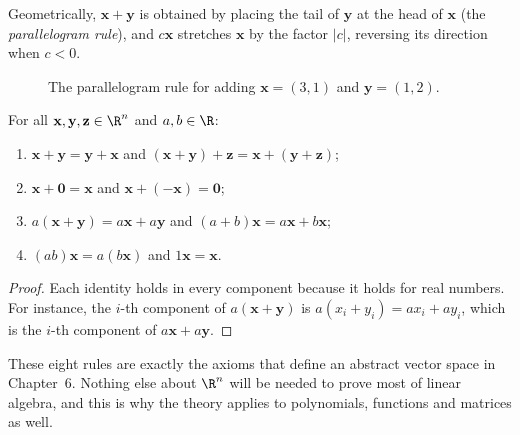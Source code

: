 Geometrically, $\mathbf{x}+\mathbf{y}$ is obtained by placing the tail of $\mathbf{y}$ at the head of $\mathbf{x}$ (the \emph{parallelogram rule}), and $c\mathbf{x}$ stretches $\mathbf{x}$ by the factor $\lvert c\rvert$, reversing its direction when $c<0$.

\begin{figure}[h]
\centering
{}
\caption{The parallelogram rule for adding $\mathbf{x}=(3,1)$ and $\mathbf{y}=(1,2)$.}
\end{figure}

\begin{theorem}\label{thm:rules}
For all $\mathbf{x},\mathbf{y},\mathbf{z}\in\R^n$ and $a,b\in\R$:
\begin{enumerate}[label=(\roman*)]
  \item $\mathbf{x}+\mathbf{y}=\mathbf{y}+\mathbf{x}$ and $(\mathbf{x}+\mathbf{y})+\mathbf{z}=\mathbf{x}+(\mathbf{y}+\mathbf{z})$;
  \item $\mathbf{x}+\mathbf{0}=\mathbf{x}$ and $\mathbf{x}+(-\mathbf{x})=\mathbf{0}$;
  \item $a(\mathbf{x}+\mathbf{y})=a\mathbf{x}+a\mathbf{y}$ and $(a+b)\mathbf{x}=a\mathbf{x}+b\mathbf{x}$;
  \item $(ab)\mathbf{x}=a(b\mathbf{x})$ and $1\mathbf{x}=\mathbf{x}$.
\end{enumerate}
\end{theorem}

\begin{proof}
Each identity holds in every component because it holds for real numbers. For instance, the $i$-th component of $a(\mathbf{x}+\mathbf{y})$ is $a(x_i+y_i)=ax_i+ay_i$, which is the $i$-th component of $a\mathbf{x}+a\mathbf{y}$.
\end{proof}

These eight rules are exactly the axioms that define an abstract vector space in Chapter~6. Nothing else about $\R^n$ will be needed to prove most of linear algebra, and this is why the theory applies to polynomials, functions and matrices as well.

